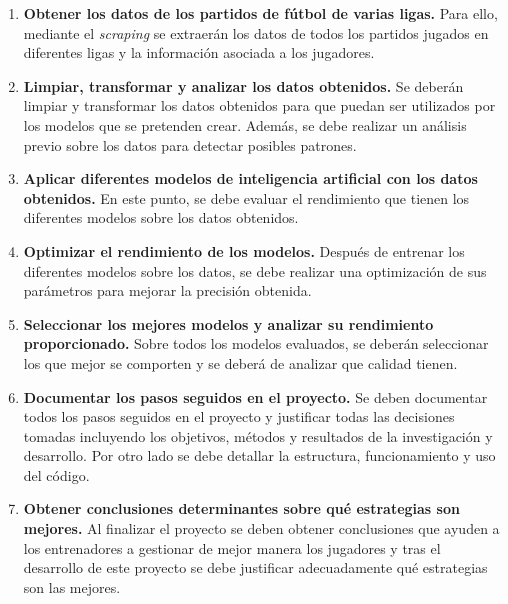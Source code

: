  \begin{enumerate}

    \item \textbf{Obtener los datos de los partidos de fútbol de varias ligas.}
    Para ello, mediante el \textit{scraping} se extraerán los datos de todos los partidos jugados en diferentes ligas y la información asociada a los jugadores.
    
    \item \textbf{Limpiar, transformar y analizar los datos obtenidos.}
    Se deberán limpiar y transformar los datos obtenidos para que puedan ser utilizados por los modelos que se pretenden crear. Además, se debe realizar un análisis previo sobre los datos para detectar posibles patrones.
    
    \item \textbf{Aplicar diferentes modelos de inteligencia artificial con los datos obtenidos.}
    En este punto, se debe evaluar el rendimiento que tienen los diferentes modelos sobre los datos obtenidos.

    \item \textbf{Optimizar el rendimiento de los modelos.}
    Después de entrenar los diferentes modelos sobre los datos, se debe realizar una optimización de sus parámetros para mejorar la precisión obtenida.

    \item \textbf{Seleccionar los mejores modelos y analizar su rendimiento proporcionado.}
    Sobre todos los modelos evaluados, se deberán seleccionar los que mejor se comporten y se deberá de analizar que calidad tienen.

    \item \textbf{Documentar los pasos seguidos en el proyecto.}
    Se deben documentar todos los pasos seguidos en el proyecto y justificar todas las decisiones tomadas incluyendo los objetivos, métodos y resultados de la investigación y desarrollo. Por otro lado se debe detallar la estructura, funcionamiento y uso del código.

    \item \textbf{Obtener conclusiones determinantes sobre qué estrategias son mejores.} Al finalizar el proyecto se deben obtener conclusiones que ayuden a los entrenadores a gestionar de mejor manera los jugadores y tras el desarrollo de este proyecto se debe justificar adecuadamente qué estrategias son las mejores.

 \end{enumerate}








